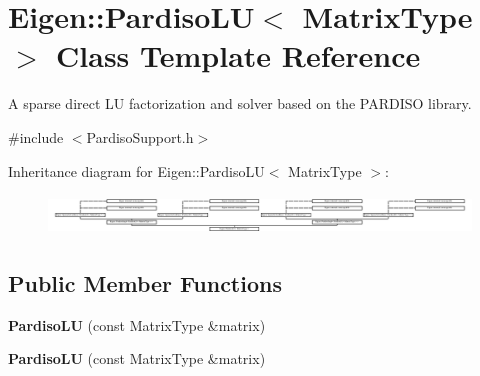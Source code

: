 \hypertarget{class_eigen_1_1_pardiso_l_u}{}\section{Eigen\+:\+:Pardiso\+LU$<$ Matrix\+Type $>$ Class Template Reference}
\label{class_eigen_1_1_pardiso_l_u}


A sparse direct LU factorization and solver based on the P\+A\+R\+D\+I\+SO library.  




{\ttfamily \#include $<$Pardiso\+Support.\+h$>$}

Inheritance diagram for Eigen\+:\+:Pardiso\+LU$<$ Matrix\+Type $>$\+:\begin{figure}[H]
\begin{center}
\leavevmode
\includegraphics[height=1.054217cm]{class_eigen_1_1_pardiso_l_u}
\end{center}
\end{figure}
\subsection*{Public Member Functions}
\begin{DoxyCompactItemize}
\item 
\mbox{\label{class_eigen_1_1_pardiso_l_u_aa4c9aeab1443d5f1923eaffb360fa5ef}} 
{\bfseries Pardiso\+LU} (const Matrix\+Type \&matrix)
\item 
\mbox{\label{class_eigen_1_1_pardiso_l_u_aa4c9aeab1443d5f1923eaffb360fa5ef}} 
{\bfseries Pardiso\+LU} (const Matrix\+Type \&matrix)
\end{DoxyCompactItemize}
